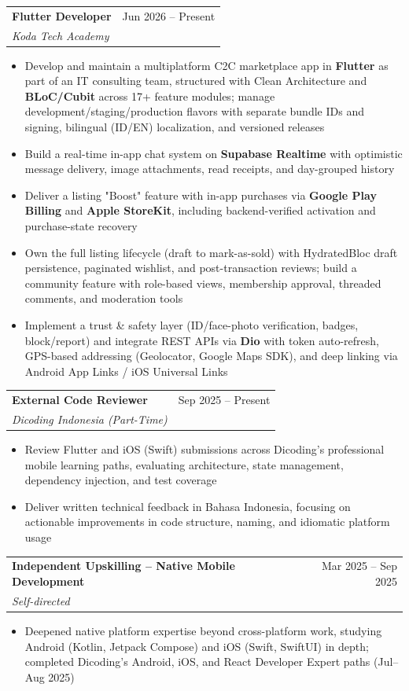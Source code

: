 \documentclass[a4paper,10pt]{article}
\makeatletter
\newcommand{\resumeItem}[1]{
  \item\small{#1 \vspace{-2pt}}
}
\newcommand{\resumeSubheading}[4]{
  \vspace{-2pt}\item
    \begin{tabular*}{0.97\textwidth}[t]{l@{\extracolsep{\fill}}r}
      \textbf{#1} & #2 \\
      \textit{\small#3} & \textit{\small #4} \\
    \end{tabular*}\vspace{-7pt}
}
\newcommand{\resumeItemListStart}{\begin{itemize}}
\newcommand{\resumeItemListEnd}{\end{itemize}\vspace{-5pt}}
\makeatother
\begin{document}
          \resumeSubheading
      {Flutter Developer}{Jun 2026 -- Present}
      {Koda Tech Academy}{}
      \resumeItemListStart
        \resumeItem{Develop and maintain a multiplatform C2C marketplace app in \textbf{Flutter} as part of an IT consulting team, structured with Clean Architecture and \textbf{BLoC/Cubit} across 17+ feature modules; manage development/staging/production flavors with separate bundle IDs and signing, bilingual (ID/EN) localization, and versioned releases}
        \resumeItem{Build a real-time in-app chat system on \textbf{Supabase Realtime} with optimistic message delivery, image attachments, read receipts, and day-grouped history}
        \resumeItem{Deliver a listing "Boost" feature with in-app purchases via \textbf{Google Play Billing} and \textbf{Apple StoreKit}, including backend-verified activation and purchase-state recovery}
        \resumeItem{Own the full listing lifecycle (draft to mark-as-sold) with HydratedBloc draft persistence, paginated wishlist, and post-transaction reviews; build a community feature with role-based views, membership approval, threaded comments, and moderation tools}
        \resumeItem{Implement a trust \& safety layer (ID/face-photo verification, badges, block/report) and integrate REST APIs via \textbf{Dio} with token auto-refresh, GPS-based addressing (Geolocator, Google Maps SDK), and deep linking via Android App Links / iOS Universal Links}
      \resumeItemListEnd



    \resumeSubheading
      {External Code Reviewer}{Sep 2025 -- Present}
      {Dicoding Indonesia (Part-Time)}{}
      \resumeItemListStart
        \resumeItem{Review Flutter and iOS (Swift) submissions across Dicoding's professional mobile learning paths, evaluating architecture, state management, dependency injection, and test coverage}
        \resumeItem{Deliver written technical feedback in Bahasa Indonesia, focusing on actionable improvements in code structure, naming, and idiomatic platform usage}
      \resumeItemListEnd

    \resumeSubheading
      {Independent Upskilling -- Native Mobile Development}{Mar 2025 -- Sep 2025}
      {Self-directed}{}
      \resumeItemListStart
        \resumeItem{Deepened native platform expertise beyond cross-platform work, studying Android (Kotlin, Jetpack Compose) and iOS (Swift, SwiftUI) in depth; completed Dicoding's Android, iOS, and React Developer Expert paths (Jul--Aug 2025)}
      \resumeItemListEnd
\end{document}

